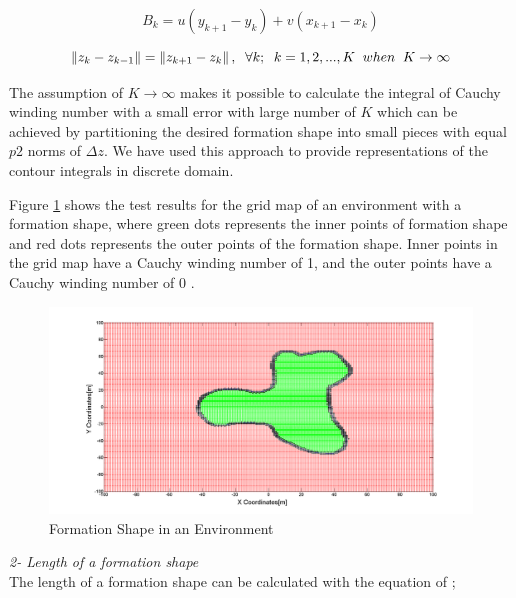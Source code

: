 \begin{equation}
B_k = u(y_{k+1} - y_k ) + v(x_{k+1} - x_k)
\end{equation}


\begin{equation}
\left\lVert z_k - z_{k-1}\right\rVert = \left\lVert z_{k+1} - z_k\right\rVert, \hspace{0.2cm}  \forall k ;  \hspace{0.2cm} k=1,2,...,K \hspace{0.2cm} when  \hspace{0.2cm} K \to\infty
\end{equation}

The assumption of $K \to\infty$ makes it possible to calculate the integral of Cauchy winding number with a small error with large number of $K$ which can be achieved by partitioning the desired formation shape  into small pieces with equal $p2$ norms of $\Delta z$. We have used this approach to provide representations of the contour integrals in discrete domain. 

Figure \ref{iceride_disarida_refe} shows the test results for the grid map of an environment with a formation shape, where green dots represents the inner points of formation shape and red dots represents the outer points of the formation shape. Inner points in the grid map have a Cauchy winding number of 1, and the outer points have a Cauchy winding number of 0 .

\begin{figure}[H]
\centering
\captionsetup{format=hang,justification=centerfirst}
\caption{Formation Shape in an Environment} \label{iceride_disarida_refe}
\includegraphics[scale = 0.28]{iceride_disarida}
\end{figure}

\textit{ 	2- Length of a formation shape} \\ 
The length of a formation shape can be calculated with the equation of \cite{17};
		
